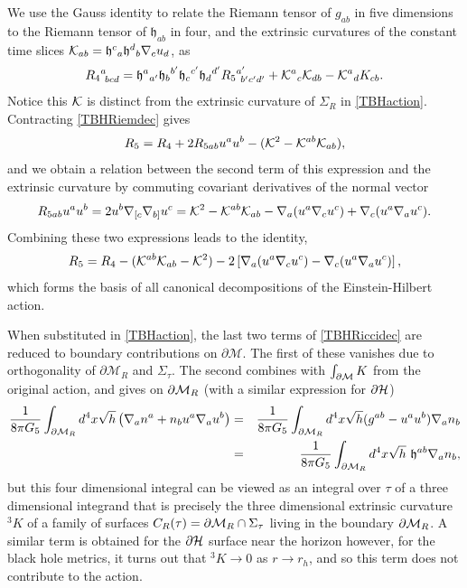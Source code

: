 \documentclass[aps,12pt,prd,superscriptaddress,preprintnumbers, 
	amssymb,
	amsmath,
	notitlepage,
	longbibliography,
	nofootinbib]{revtex4-1}
\newcommand\bea {\begin{eqnarray}}
\newcommand\eea {\end{eqnarray}}
\begin{document}
We use the Gauss identity to relate the Riemann tensor of $g_{ab}$ 
in five dimensions to the Riemann tensor of $\mathfrak{h}_{ab}$ in four, 
and the extrinsic curvatures of the constant time slices 
${\cal K}_{ab}=\mathfrak{h}^c{}_a \mathfrak{h}^d{}_b \nabla_c u_d$, as
\begin{equation}
R_4{}^a_{~bcd}= 
\mathfrak{h}^a{}_{a'} \mathfrak{h}_b{}^{b'} \mathfrak{h}_c{}^{c'} 
\mathfrak{h}_d{}^{d'} R_5{}^{a'}_{~b'c'd'}    
+  {\cal K}^a{}_c {\cal K}_{db} - {\cal K}^a{}_d K_{cb} . 
\label{TBHRiemdec}
\end{equation}
Notice this ${\cal K}$ is distinct from the extrinsic curvature  
of $\Sigma_R$ in \eqref{TBHaction}.
Contracting \eqref{TBHRiemdec} gives 
\begin{equation}
R_5 =R_4 + 2  R_{5ab} u^a u^b - ({\cal K}^2 -{\cal K}^{ab}{\cal K}_{ab}),
\end{equation}
and we obtain a relation between the second term of this expression 
and the extrinsic curvature by commuting covariant derivatives of the 
normal vector
\begin{equation}
R_{5ab} u^a u^b = 2 u^b \nabla_{[c}\nabla_{b]}u^c
= {\cal K}^2 - {\cal K}^{ab} {\cal K}_{ab} - \nabla_{a}(u^a \nabla_{c}u^c) 
+ \nabla_{c}(u^a \nabla_{a}u^c).
\end{equation}
Combining these two expressions leads to the identity,
\begin{equation}
R_5 =R_4 - ({\cal K}^{ab} {\cal K}_{ab} - {\cal K}^2) - 
2 \left[  \nabla_{a}(u^a \nabla_{c}u^c) - \nabla_{c}(u^a \nabla_{a}u^c) \right],
\label{TBHRiccidec}
\end{equation}
which forms the basis of all canonical decompositions of the Einstein-Hilbert action.

When substituted in \eqref{TBHaction}, the last two terms of 
\eqref{TBHRiccidec} are reduced to boundary contributions on 
$\partial \mathcal{M}$. The first of these vanishes due to orthogonality
of $\partial \mathcal{M}_R$ and $\Sigma_\tau$. 
The second combines with $\int_{\partial {\cal M}} K$ 
from the original action, and gives on $\partial{\cal M}_R$
(with a similar expression for $\partial{\cal H}$)
\bea
\frac{1}{8\pi G_5} \int_{\partial{\cal M}_R} d^4x \sqrt{h}
\left( \nabla_a n^a + n_b u^a \nabla_a u^b \right) &=&
\frac{1}{8\pi G_5} \int_{\partial{\cal M}_R} d^4x \sqrt{h} 
(g^{ab} - u^a u^b) \nabla_a n_b \nonumber \\
&=& \frac{1}{8\pi G_5} \int_{\partial{\cal M}_R} d^4x \sqrt{h}~ 
\mathfrak{h}^{ab} \nabla_a n_b ,
\label{TBHextcurv}
\eea
but this four dimensional integral can be viewed as an integral over 
$\tau$ of a three dimensional integrand that is precisely the three
dimensional extrinsic curvature ${}^3K$ of a family of surfaces 
$C_R(\tau) = \partial{\cal M}_R \cap \Sigma_\tau $ living in the 
boundary $\partial{\cal M}_R$.
A similar term is obtained for the $\partial{\cal H}$ surface near the 
horizon however, for the black hole metrics, it turns out that $^3 K\to 0$ 
as $r\to r_h$, and so this term does not contribute to the action.
\end{document}
